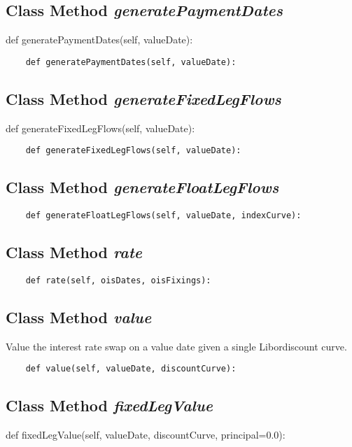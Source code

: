 \documentclass[twoside,11pt]{book}
\begin{document}
\subsection{Class Method {\it generatePaymentDates}}
def generatePaymentDates(self, valueDate):

\begin{lstlisting}
    def generatePaymentDates(self, valueDate):
\end{lstlisting}

\subsection{Class Method {\it generateFixedLegFlows}}
def generateFixedLegFlows(self, valueDate):

\begin{lstlisting}
    def generateFixedLegFlows(self, valueDate):
\end{lstlisting}

\subsection{Class Method {\it generateFloatLegFlows}}


\begin{lstlisting}
    def generateFloatLegFlows(self, valueDate, indexCurve):
\end{lstlisting}

\subsection{Class Method {\it rate}}


\begin{lstlisting}
    def rate(self, oisDates, oisFixings):
\end{lstlisting}

\subsection{Class Method {\it value}}
Value the interest rate swap on a value date given a single Libordiscount curve. 

\begin{lstlisting}
    def value(self, valueDate, discountCurve):
\end{lstlisting}

\subsection{Class Method {\it fixedLegValue}}
def fixedLegValue(self, valueDate, discountCurve, principal=0.0):
\end{document}
